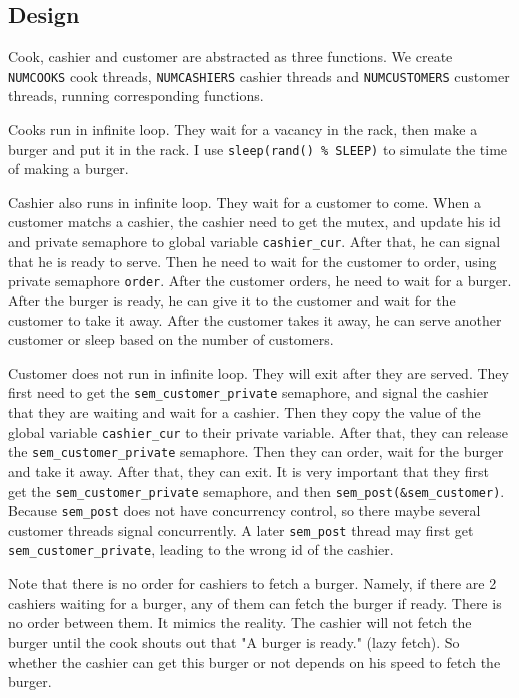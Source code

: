 \subsection{Design}
Cook, cashier and customer are abstracted as three functions. We create \texttt{NUMCOOKS} cook threads, \texttt{NUMCASHIERS} cashier threads and \texttt{NUMCUSTOMERS} customer threads, running corresponding functions.

Cooks run in infinite loop. They wait for a vacancy in the rack, then make a burger and put it in the rack. I use \texttt{sleep(rand() \% SLEEP)} to simulate the time of making a burger.

Cashier also runs in infinite loop. They wait for a customer to come.
When a customer matchs a cashier, the cashier need to get the mutex, and update his id and private semaphore to global variable \texttt{cashier\_cur}. After that, 
he can signal that he is ready to serve. Then he need to wait for the customer to order, using private semaphore \texttt{order}. After the customer orders, he need to wait for a burger. 
After the burger is ready, he can give it to the customer and wait for the customer to take it away. After the customer takes it away, he can serve another customer or sleep based on the number of customers.

Customer does not run in infinite loop. They will exit after they are served. 
They first need to get the \texttt{sem\_customer\_private} semaphore, and signal the cashier that they are waiting and wait for a cashier. 
Then they copy the value of the global variable \texttt{cashier\_cur} to their private variable. After that, they can release the \texttt{sem\_customer\_private} semaphore. 
Then they can order, wait for the burger and take it away. After that, they can exit. 
It is very important that they first get the \texttt{sem\_customer\_private} semaphore, and then \texttt{sem\_post(\&sem\_customer)}.
Because \texttt{sem\_post} does not have concurrency control, so there maybe several customer threads signal concurrently. A later \texttt{sem\_post} thread may first get \texttt{sem\_customer\_private}, leading to the wrong id of the cashier.

Note that there is no order for cashiers to fetch a burger. Namely, if there are 2 cashiers waiting for a burger, any of them can fetch the burger if ready. There is no order between them. It mimics the reality. The cashier 
will not fetch the burger until the cook shouts out that "A burger is ready." (lazy fetch). So whether the cashier can get this burger or not depends on his speed to fetch the burger. 

